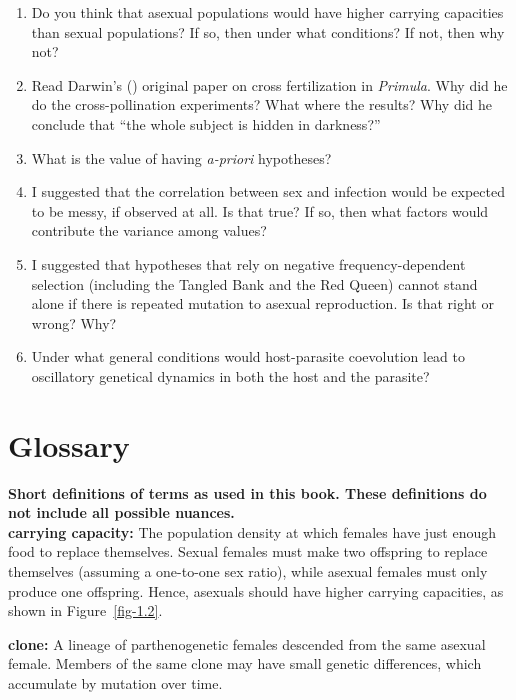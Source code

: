 \documentclass[
  letterpaper,
]{book}
\providecommand{\tightlist}{%
  \setlength{\itemsep}{0pt}\setlength{\parskip}{0pt}}\usepackage{longtable,booktabs,array}
\begin{document}
\begin{enumerate}
\def\labelenumi{\arabic{enumi}.}
\tightlist
\item
  Do you think that asexual populations would have higher carrying
  capacities than sexual populations? If so, then under what conditions?
  If not, then why not?
\item
  Read Darwin's () original paper on
  cross fertilization in \emph{Primula}. Why did he do the
  cross-pollination experiments? What where the results? Why did he
  conclude that ``the whole subject is hidden in darkness?''
\item
  What is the value of having \emph{a-priori} hypotheses?
\item
  I suggested that the correlation between sex and infection would be
  expected to be messy, if observed at all. Is that true? If so, then
  what factors would contribute the variance among values?
\item
  I suggested that hypotheses that rely on negative frequency-dependent
  selection (including the Tangled Bank and the Red Queen) cannot stand
  alone if there is repeated mutation to asexual reproduction. Is that
  right or wrong? Why?
\item
  Under what general conditions would host-parasite coevolution lead to
  oscillatory genetical dynamics in both the host and the parasite?
\end{enumerate}


\chapter*{Glossary}\label{sec-glossary}


\textbf{Short definitions of terms as used in this book. These
definitions do not include all possible nuances.}\\

\textbf{carrying capacity:} The population density at which females have
just enough food to replace themselves. Sexual females must make two
offspring to replace themselves (assuming a one-to-one sex ratio), while
asexual females must only produce one offspring. Hence, asexuals should
have higher carrying capacities, as shown in Figure~\ref{fig-1.2}.

\textbf{clone:} A lineage of parthenogenetic females descended from the
same asexual female. Members of the same clone may have small genetic
differences, which accumulate by mutation over time.
\end{document}
